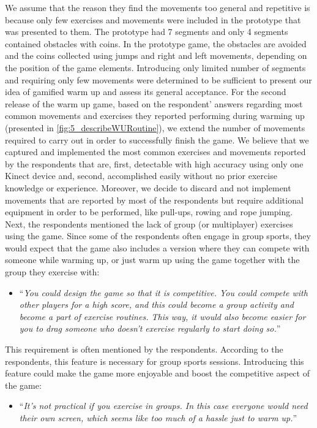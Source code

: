 We assume that the reason they find the movements too general and repetitive is because only few exercises and movements were included in the prototype that was presented to them. The prototype had 7 segments and only 4 segments contained obstacles with coins. In the prototype game, the obstacles are avoided and the coins collected using jumps and right and left movements, depending on the position of the game elements. Introducing only limited number of segments and requiring only few movements were determined to be sufficient to present our idea of gamified warm up and assess its general acceptance. For the second release of the warm up game, based on the respondent' answers regarding most common movements and exercises they reported performing during warming up (presented in \ref{fig:5_describeWURoutine}), we extend the number of movements required to carry out in order to successfully finish the game. We believe that we captured and implemented the most common exercises and movements reported by the respondents that are, first, detectable with high accuracy using only one Kinect device and, second, accomplished easily without no prior exercise knowledge or experience. Moreover, we decide to discard and not implement movements that are reported by most of the respondents but require additional equipment in order to be performed, like pull-ups, rowing and rope jumping. 
Next, the respondents mentioned the lack of group (or multiplayer) exercises using the game. Since some of the respondents often engage in group sports, they would expect that the game also includes a version where they can compete with someone while warming up, or just warm up using the game together with the group they exercise with:
\begin{itemize}
\item ``\textit{You could design the game so that it is competitive. You could compete with other players for a high score, and this could become a group activity and become a part of exercise routines. This way, it would also become easier for you to drag someone who doesn't exercise regularly to start doing so.}''
\end{itemize}
This requirement is often mentioned by the respondents. According to the respondents, this feature is necessary for group sports sessions. Introducing this feature could make the game more enjoyable and boost the competitive aspect of the game:
\begin{itemize}
\item ``\textit{It's not practical if you exercise in groups. In this case everyone would need their own screen, which seems like too much of a hassle just to warm up.}''
\end{itemize}
